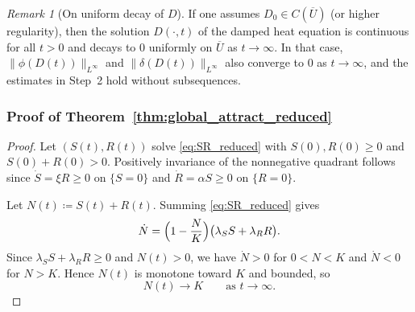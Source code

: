 \documentclass[pdflatex,sn-mathphys-ay]{sn-jnl}
\theoremstyle{thmstyleone}
\theoremstyle{definition}
\theoremstyle{remark}
\newtheorem{remark}[theorem]{Remark}
\begin{document}
\begin{remark}[On uniform decay of $D$]
If one assumes $D_0\in C(\overline U)$ (or higher regularity), then the solution $D(\cdot,t)$ of the damped heat equation is continuous for
all $t>0$ and decays to $0$ uniformly on $\overline U$ as $t\to\infty$.
In that case, $\|\phi(D(t))\|_{L^\infty}$ and $\|\delta(D(t))\|_{L^\infty}$ also converge to $0$ as $t\to\infty$, and the estimates in Step~2
hold without subsequences.
\end{remark}

\subsubsection*{Proof of Theorem~\ref{thm:global_attract_reduced}}
\begin{proof}
Let $(S(t),R(t))$ solve \eqref{eq:SR_reduced} with $S(0),R(0)\ge0$ and $S(0)+R(0)>0$.
Positively invariance of the nonnegative quadrant follows since $\dot S=\xi R\ge0$ on $\{S=0\}$ and $\dot R=\alpha S\ge0$ on $\{R=0\}$.

Let $N(t)\coloneqq S(t)+R(t)$. Summing \eqref{eq:SR_reduced} gives
\[
\dot N = \Bigl(1-\frac{N}{K}\Bigr)\bigl(\lambda_S S+\lambda_R R\bigr).
\]
Since $\lambda_S S+\lambda_R R\ge0$ and $N(t)>0$, we have $\dot N>0$ for $0<N<K$ and $\dot N<0$ for $N>K$.
Hence $N(t)$ is monotone toward $K$ and bounded, so
\begin{equation}
\label{eq:analysis_N_to_K}
N(t)\to K \qquad \text{as } t\to\infty.
\end{equation}


\end{proof}
\end{document}
